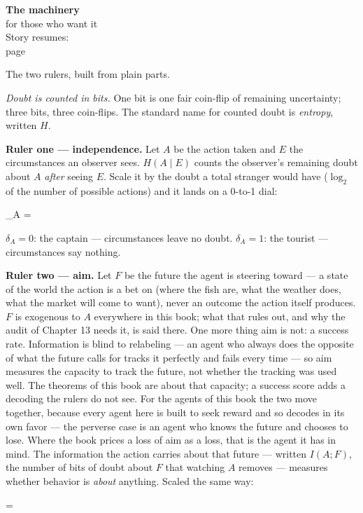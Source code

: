 \begin{machinery}{\textbf{The machinery}\\for those who want it\\[3pt]{\color{muted}Story resumes:\\page~\pageref{ch5}}}

The two rulers, built from plain parts.

\emph{Doubt is counted in bits.} One bit is one fair coin-flip of remaining
uncertainty; three bits, three coin-flips. The standard name for
counted doubt is \emph{entropy}, written \(H\).

\textbf{Ruler one --- independence.} Let \(A\) be the action taken and \(E\) the circumstances an observer sees. \(H(A \mid E)\) counts the observer's remaining doubt about \(A\) \emph{after} seeing \(E\). Scale it by the doubt a total stranger
would have (\(\log_2\) of the number of possible actions) and it lands on a
0-to-1 dial:

\begin{dispmath}\delta_A = \end{dispmath}

\noindent \(\delta_A = 0\): the captain --- circumstances leave no doubt. \(\delta_A = 1\): the tourist --- circumstances say nothing.

\textbf{Ruler two --- aim.} Let \(F\) be the future the agent is steering toward ---
a state of the world the action is a bet on (where the fish are, what
the weather does, what the market will come to want), never an outcome
the action itself produces. \(F\) is exogenous to \(A\) everywhere in this
book; what that rules out, and why the audit of Chapter 13 needs it, is
said there. One more thing aim is not: a success rate. Information is
blind to relabeling --- an agent who always does the opposite of what the
future calls for tracks it perfectly and fails every time --- so aim
measures the capacity to track the future, not whether the tracking
was used well. The theorems of this book are about that capacity; a
success score adds a decoding the rulers do not see. For the agents of
this book the two move together, because every agent here is built to
seek reward and so decodes in its own favor --- the perverse case is an
agent who knows the future and chooses to lose. Where the book prices a
loss of aim as a loss, that is the agent it has in mind.
The information the action carries about that future --- written \(I(A;F)\), the number of bits of doubt about \(F\) that watching \(A\) removes --- measures
whether behavior is \emph{about} anything. Scaled the same way:

\begin{dispmath} = \end{dispmath}


\end{machinery}
